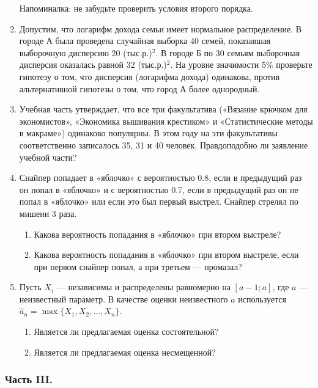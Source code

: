 \begin{enumerate}
Напоминалка: не забудьте проверить условия второго порядка.

\item Допустим, что логарифм дохода семьи имеет нормальное распределение. В городе А была проведена случайная выборка 40 семей, показавшая выборочную дисперсию 20 (тыс.р.)$^{2}$. В городе Б по 30 семьям выборочная дисперсия оказалась равной 32 (тыс.р.)$^{2}$.
На уровне значимости 5\% проверьте гипотезу о том, что дисперсия (логарифма дохода) одинакова, против альтернативной гипотезы о том, что город А более однородный.

\item Учебная часть утверждает, что все три факультатива («Вязание крючком для экономистов», «Экономика вышивания крестиком» и «Статистические методы в макраме») одинаково популярны. В этом году на эти факультативы соответственно записалось 35, 31 и 40 человек. Правдоподобно ли заявление учебной части?

\item Снайпер попадает в «яблочко» с вероятностью 0.8, если в предыдущий раз он попал в «яблочко» и с вероятностью 0.7, если в предыдущий раз он не попал в «яблочко» или если это был первый выстрел. Снайпер стрелял по мишени 3 раза.
\begin{enumerate}
\item Какова вероятность попадания в «яблочко» при втором выстреле?
\item Какова вероятность попадания в «яблочко» при втором выстреле, если при первом снайпер попал, а при третьем — промазал?
\end{enumerate}

\item Пусть $X_{i}$ — независимы и распределены равномерно на $[a-1;a]$, где $a$ — неизвестный параметр. В качестве оценки неизвестного $a$ используется $\hat{a}_{n}=\max\{X_{1},X_{2},...,X_{n}\}$.
\begin{enumerate}
\item Является ли предлагаемая оценка состоятельной?
\item Является ли предлагаемая оценка несмещенной?
\end{enumerate}
\end{enumerate}

\subsubsection*{Часть III.}

